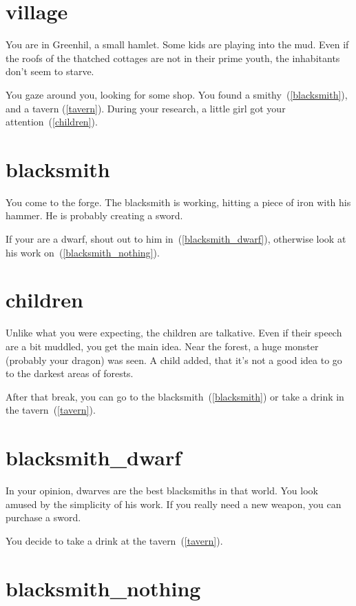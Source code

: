 
\section{village}

You are in Greenhil, a small hamlet. Some kids are playing into the mud. Even
if the roofs of the thatched cottages are not in their prime youth, the
inhabitants don't seem to starve.

You gaze around you, looking for some shop. You found a
smithy~(\ref{blacksmith}), and a tavern (\ref{tavern}). During your research, a
little girl got your attention~(\ref{children}).

\section{blacksmith}

You come to the forge. The blacksmith is working, hitting a piece of iron with
his hammer. He is probably creating a sword.

If your are a dwarf, shout out to him in~(\ref{blacksmith_dwarf}), otherwise
look at his work on~(\ref{blacksmith_nothing}).

\section{children}

Unlike what you were expecting, the children are talkative. Even if their speech
are a bit muddled, you get the main idea. Near the forest, a huge monster
(probably your dragon) was seen. A child added, that it's not a good idea to go
to the darkest areas of forests.

After that break, you can go to the blacksmith~(\ref{blacksmith}) or take a drink in
the tavern~(\ref{tavern}).

\section{blacksmith_dwarf}

In your opinion, dwarves are the best blacksmiths in that world. You look amused
by the simplicity of his work. If you really need a new weapon, you can
purchase a sword.

You decide to take a drink at the tavern~(\ref{tavern}).

\section{blacksmith_nothing}

